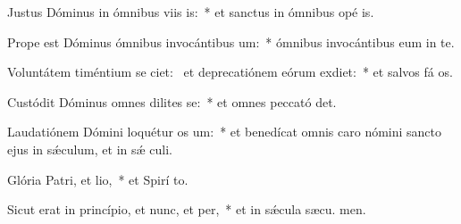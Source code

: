 \item Justus Dóminus in ómnibus viis is:~* et sanctus in ómnibus opé is.
\item Prope est Dóminus ómnibus invocántibus um:~* ómnibus invocántibus eum in te.
\item Voluntátem timéntium se ciet:~\pscross{} et deprecatiónem eórum exdiet:~* et salvos fá os.
\item Custódit Dóminus omnes dilites se:~* et omnes peccató det.
\item Laudatiónem Dómini loquétur os um:~* et benedícat omnis caro nómini sancto ejus in sǽculum, et in sǽ culi.
\item Glória Patri, et lio,~* et Spirí to.
\item Sicut erat in princípio, et nunc, et per,~* et in sǽcula sæcu. men.
